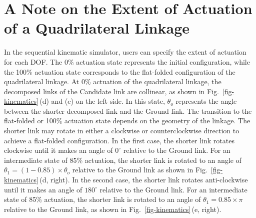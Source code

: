 \section{A Note on the Extent of Actuation of a Quadrilateral Linkage}\label{apdx-subsec-actuation}
In the sequential kinematic simulator, users can specify the extent of actuation for each DOF. The 0\% actuation state represents the initial configuration, while the 100\% actuation state corresponds to the flat-folded configuration of the quadrilateral linkage. At 0\% actuation of the quadrilateral linkage, the decomposed links of the Candidate link are collinear, as shown in Fig.~\ref{fig-kinematics}\,(d) and (e) on the left side. In this state, \(\theta{}_o\) represents the angle between the shorter decomposed link and the Ground link. The transition to the flat-folded or 100\% actuation state depends on the geometry of the linkage. The shorter link may rotate in either a clockwise or counterclockwise direction to achieve a flat-folded configuration. In the first case, the shorter link rotates clockwise until it makes an angle of \(0^\circ{}\) relative to the Ground link. For an intermediate state of 85\% actuation, the shorter link is rotated to an angle of \(\theta{}_1 = (1 - 0.85)\times\theta{}_o\) relative to the Ground link as shown in Fig.~\ref{fig-kinematics}\,(d, right). In the second case, the shorter link rotates anti-clockwise until it makes an angle of \(180^\circ{}\) relative to the Ground link. For an intermediate state of 85\% actuation, the shorter link is rotated to an angle of \(\theta{}_1 = 0.85\times\pi{}\) relative to the Ground link, as shown in Fig.~\ref{fig-kinematics}\,(e, right).